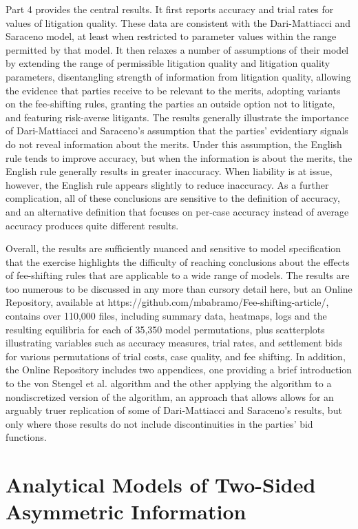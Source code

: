 \documentclass{article}
\begin{document}
Part 4 provides the central results. It first reports accuracy and trial rates for values of litigation quality. These data are consistent with the Dari-Mattiacci and Saraceno model, at least when restricted to parameter values within the range permitted by that model. It then relaxes a number of assumptions of their model by extending the range of permissible litigation quality and litigation quality parameters, disentangling strength of information from litigation quality, allowing the evidence that parties receive to be relevant to the merits, adopting variants on the fee-shifting rules, granting the parties an outside option not to litigate, and featuring risk-averse litigants. The results generally illustrate the importance of Dari-Mattiacci and Saraceno's assumption that the parties' evidentiary signals do not reveal information about the merits. Under this assumption, the English rule tends to improve accuracy, but when the information is about the merits, the English rule generally results in greater inaccuracy. When liability is at issue, however, the English rule appears slightly to reduce inaccuracy. As a further complication, all of these conclusions are sensitive to the definition of accuracy, and an alternative definition that focuses on per-case accuracy instead of average accuracy produces quite different results. 

Overall, the results are sufficiently nuanced and sensitive to model specification that the exercise highlights the difficulty of reaching conclusions about the effects of fee-shifting rules that are applicable to a wide range of models. The results are too numerous to be discussed in any more than cursory detail here, but an Online Repository, available at https://github.com/mbabramo/Fee-shifting-article/, contains over 110,000 files, including summary data, heatmaps, logs and the resulting equilibria for each of 35,350 model permutations, plus scatterplots illustrating variables such as accuracy measures, trial rates, and settlement bids for various permutations of trial costs, case quality, and fee shifting. In addition, the Online Repository includes two appendices, one providing a brief introduction to the von Stengel et al. algorithm and the other applying the algorithm to a nondiscretized version of the algorithm, an approach that allows allows for an arguably truer replication of some of Dari-Mattiacci and Saraceno's results, but only where those results do not include discontinuities in the parties' bid functions.

\section{Analytical Models of Two-Sided Asymmetric Information}
\end{document}
